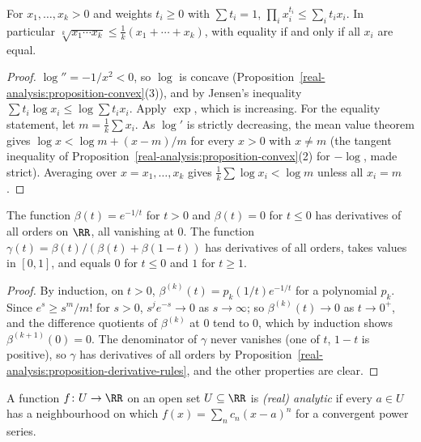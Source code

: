 \begin{corollary}\label{real-analysis:corollary-am-gm}
For $x_1, \ldots, x_k > 0$ and weights $t_i \geq 0$ with $\sum t_i = 1$, $\prod_ix_i^{t_i} \leq \sum_it_ix_i$. In particular $\sqrt[k]{x_1\cdots x_k} \leq \frac{1}{k}(x_1 + \cdots + x_k)$, with equality if and only if all $x_i$ are equal.
\end{corollary}

\begin{proof}
$\log'' = -1/x^2 < 0$, so $\log$ is concave (Proposition~\ref{real-analysis:proposition-convex}(3)), and by Jensen's inequality $\sum t_i\log x_i \leq \log\sum t_ix_i$. Apply $\exp$, which is increasing. For
the equality statement, let $m = \frac1k\sum x_i$. As $\log'$ is strictly decreasing, the mean value theorem gives $\log x < \log m + (x - m)/m$ for every $x > 0$ with $x \neq m$ (the tangent inequality of
Proposition~\ref{real-analysis:proposition-convex}(2) for $-\log$, made strict). Averaging over $x = x_1, \ldots, x_k$ gives $\frac1k\sum\log x_i < \log m$ unless all $x_i = m$.
\end{proof}

\begin{lemma}\label{real-analysis:lemma-bump}
The function $\beta(t) = e^{-1/t}$ for $t > 0$ and $\beta(t) = 0$ for $t \leq 0$ has derivatives of all orders on $\RR$, all vanishing at $0$. The function
$\gamma(t) = \beta(t)/(\beta(t) + \beta(1 - t))$ has derivatives of all orders, takes values in $[0, 1]$, and equals $0$ for $t \leq 0$ and $1$ for $t \geq 1$.
\end{lemma}

\begin{proof}
By induction, on $t > 0$, $\beta^{(k)}(t) = p_k(1/t)e^{-1/t}$ for a polynomial $p_k$. Since $e^{s} \geq s^{m}/m!$ for $s > 0$, $s^je^{-s} \to 0$ as $s \to \infty$; so $\beta^{(k)}(t) \to 0$ as $t \to 0^+$, and
the difference quotients of $\beta^{(k)}$ at $0$ tend to $0$, which by induction shows $\beta^{(k+1)}(0) = 0$. The denominator of $\gamma$ never vanishes (one of $t$, $1 - t$ is positive), so $\gamma$ has derivatives of all orders by
Proposition~\ref{real-analysis:proposition-derivative-rules}, and the other properties are clear.
\end{proof}

\begin{definition}\label{real-analysis:definition-analytic}
A function $f \colon U \to \RR$ on an open set $U \subseteq \RR$ is \emph{(real) analytic} if every $a \in U$ has a neighbourhood on which $f(x) = \sum_nc_n(x - a)^n$ for a convergent power series.
\end{definition}


